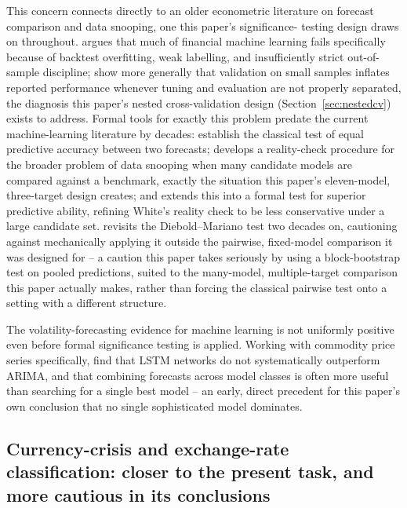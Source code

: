 \documentclass[final,3p,times,authoryear]{elsarticle}
\begin{document}
This concern connects directly to an older econometric literature on
forecast comparison and data snooping, one this paper's significance-
testing design draws on throughout. \citet{deprado2018} argues that
much of financial machine learning fails specifically because of
backtest overfitting, weak labelling, and insufficiently strict out-of-
sample discipline; \citet{vabalas2019} show more generally that
validation on small samples inflates reported performance whenever
tuning and evaluation are not properly separated, the diagnosis this
paper's nested cross-validation design (Section~\ref{sec:nestedcv})
exists to address. Formal tools for exactly this problem predate the
current machine-learning literature by decades:
\citet{dieboldmariano1995} establish the classical test of equal
predictive accuracy between two forecasts; \citet{white2000} develops a
reality-check procedure for the broader problem of data snooping when
many candidate models are compared against a benchmark, exactly the
situation this paper's eleven-model, three-target design creates; and
\citet{hansen2005} extends this into a formal test for superior
predictive ability, refining White's reality check to be less
conservative under a large candidate set. \citet{diebold2015} revisits
the Diebold--Mariano test two decades on, cautioning against
mechanically applying it outside the pairwise, fixed-model comparison it
was designed for -- a caution this paper takes seriously by using a
block-bootstrap test on pooled predictions, suited to the many-model,
multiple-target comparison this paper actually makes, rather than
forcing the classical pairwise test onto a setting with a different
structure.

The volatility-forecasting evidence for machine learning is not
uniformly positive even before formal significance testing is applied.
Working with commodity price series specifically, \citet{lytraoredia2021}
find that LSTM networks do not systematically outperform ARIMA, and that
combining forecasts across model classes is often more useful than
searching for a single best model -- an early, direct precedent for this
paper's own conclusion that no single sophisticated model dominates.

\subsection{Currency-crisis and exchange-rate classification: closer to
the present task, and more cautious in its conclusions}
\end{document}

